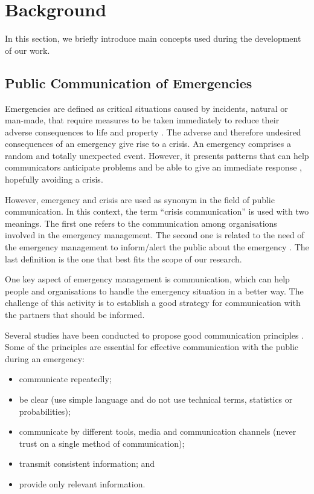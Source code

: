 \section{Background}\label{sec:background}

In this section, we briefly introduce main concepts used during the development of our work. 

\subsection{Public Communication of Emergencies}

Emergencies are defined as critical situations caused by incidents, natural or man-made, that require measures to be taken immediately to reduce their adverse consequences to life and property \citep{dha1992internationally}. The adverse and therefore undesired consequences of an emergency give rise to a crisis.
An emergency comprises a random and totally unexpected event. However, it presents patterns that can help communicators anticipate problems and be able to give an immediate response \citep{cdc2014}, hopefully avoiding a crisis.

However, emergency and crisis are used as synonym in the field of public communication. In this context, the term ``crisis communication'' is used with two meanings. The first one refers to the communication among organisations involved in the emergency management. The second one is related to the need of the emergency management to inform/alert the public about the emergency \citep{cdc2014}. The last definition is the one that best fits the scope of our research.

One key aspect of emergency management is communication, which can help people and organisations to handle the emergency situation in a better way. The challenge of this activity is to establish a good strategy for communication with the partners that should be informed.

Several studies have been conducted to propose good communication principles \citep{cdc2014} \citep{seeger2006best} \citep{goldfine2011best} \citep{glik2007} \citep{tinker2010} \citep{panamericanhealthorganization2009}. Some of the principles are essential for effective communication with the public during an emergency:

\begin{itemize}
   \item communicate repeatedly;
   \item be clear (use simple language and do not use technical terms, statistics or probabilities);
   \item communicate by different tools, media and communication channels (never trust on a single method of communication);
   \item transmit consistent information; and
   \item provide only relevant information.
   
 \end{itemize}
 
